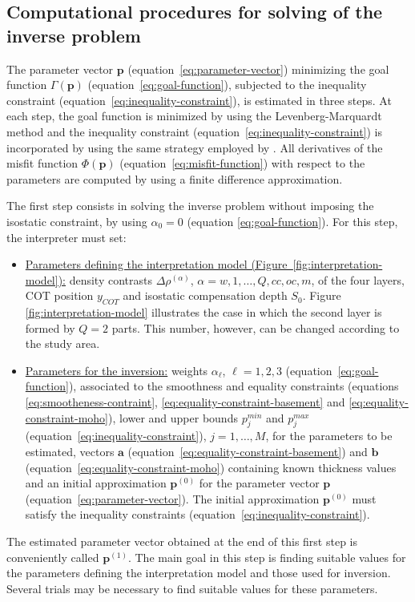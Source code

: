 \documentclass[manuscript]{geophysics}
\begin{document}
\subsection{Computational procedures for solving of the inverse problem}

The parameter vector $\mathbf{p}$ (equation~\ref{eq:parameter-vector}) minimizing the
goal function $\Gamma (\mathbf{p})$ (equation~\ref{eq:goal-function}), subjected to
the inequality constraint (equation~\ref{eq:inequality-constraint}), is estimated 
in three steps. At each step, the goal function is minimized by using the Levenberg-Marquardt 
method \citep{silva-etal2001, aster-etal2005} and the inequality constraint 
(equation~\ref{eq:inequality-constraint}) is incorporated by using the same strategy 
employed by \citet{barbosa-etal1999}.
All derivatives of the misfit function $\Phi(\mathbf{p})$ (equation~\ref{eq:misfit-function})
with respect to the parameters are computed by using a finite difference approximation.

The first step consists in solving the inverse problem without imposing the isostatic
constraint, by using $\alpha_{0} = 0$ (equation \ref{eq:goal-function}). For this step,
the interpreter must set:
\begin{itemize}
	\item \underline{Parameters defining the interpretation model
	(Figure~\ref{fig:interpretation-model}):} density contrasts $\Delta \rho^{(\alpha)}$, 
	$\alpha = w, 1, \dots, Q, cc, oc, m$, of the four layers, COT position $y_{COT}$ and
	isostatic compensation depth $S_{0}$. Figure \ref{fig:interpretation-model} illustrates 
	the case in which the second layer is formed by $Q = 2$ parts. This number, however, 
	can be changed according to the study area.
	\item \underline{Parameters for the inversion:} weights $\alpha_{\ell}$,
	$\ell = 1, 2, 3$ (equation~\ref{eq:goal-function}), associated to the 
	smoothness and equality constraints (equations \ref{eq:smootheness-contraint},
	\ref{eq:equality-constraint-basement} and \ref{eq:equality-constraint-moho}),
	lower and upper bounds $p_{j}^{min}$ and $p_{j}^{max}$
	(equation~\ref{eq:inequality-constraint}), $j = 1, \dots, M$,
	for the parameters to be estimated, vectors $\mathbf{a}$ 
	(equation~\ref{eq:equality-constraint-basement}) and $\mathbf{b}$
	(equation~\ref{eq:equality-constraint-moho}) containing known thickness values
	and an initial approximation $\mathbf{p}^{(0)}$ for the parameter vector $\mathbf{p}$
	(equation~\ref{eq:parameter-vector}). The initial approximation $\mathbf{p}^{(0)}$
	must satisfy the inequality constraints (equation~\ref{eq:inequality-constraint}).
\end{itemize}
The estimated parameter vector obtained at the end of this first step is conveniently called
$\mathbf{p}^{(1)}$. The main goal in this step is finding suitable values for the parameters
defining the interpretation model and those used for inversion. Several trials may be
necessary to find suitable values for these parameters. 
\end{document}
